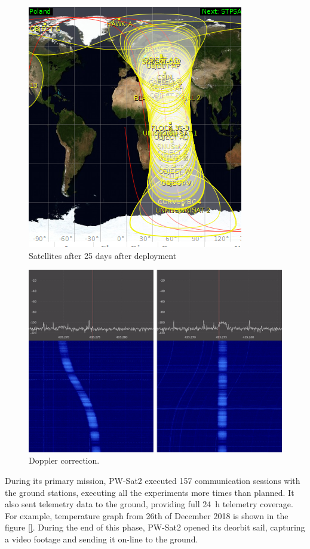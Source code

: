 \begin{figure}[H]
    \centering
    \includegraphics[width=0.4\paperwidth]{img/9/25_days.png}
    \caption{Satellites after \si{25} days after deployment}
    \label{25_days}
\end{figure}

\begin{figure}
    \centering
    \includegraphics[width=0.6\paperwidth]{img/9/doppler_correction.png}
    \caption{Doppler correction.}
    \label{Doppler_correction_gqrx}
\end{figure}

During its primary mission, PW-Sat2 executed \si{157} communication sessions with the ground stations, executing all the experiments more times than planned. It also sent telemetry data to the ground, providing full \SI{24}{\hour} telemetry coverage. For example, temperature graph from 26th of December 2018 is shown in the figure \ref{}. During the end of this phase, PW-Sat2 opened its deorbit sail, capturing a video footage and sending it on-line to the ground.



